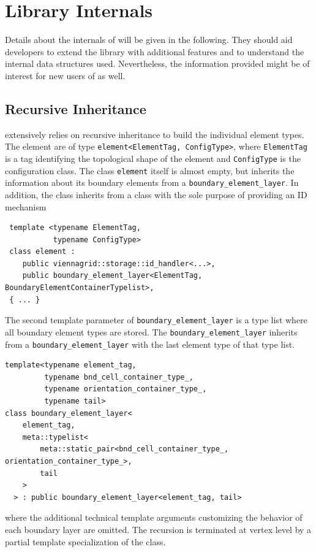 \chapter{Library Internals} \label{chap:internals}

Details about the internals of {\ViennaGrid} will be given in the following.
They should aid developers to extend the library with additional features
and to understand the internal data structures used.
Nevertheless, the information provided might be of interest for new users of {\ViennaGrid} as well.

\section{Recursive Inheritance}
{\ViennaGrid} extensively relies on recursive inheritance to build the individual element types.
The element are of type \lstinline|element<ElementTag, ConfigType>|, where \lstinline|ElementTag| is a tag identifying the topological shape of the element and \lstinline|ConfigType| is the configuration class.
The class \lstinline|element| itself is almost empty, but
inherits the information about its boundary elements from a \lstinline|boundary_element_layer|.
In addition, the class inherits from a class with the sole purpose of providing an ID mechanism
\begin{lstlisting}
 template <typename ElementTag,
           typename ConfigType>
 class element :
    public viennagrid::storage::id_handler<...>,
    public boundary_element_layer<ElementTag, BoundaryElementContainerTypelist>,
 { ... }
\end{lstlisting}
The second template parameter of \lstinline|boundary_element_layer| is a type list where all boundary element types are stored.
The \lstinline|boundary_element_layer| inherits from a \lstinline|boundary_element_layer| with the last element type of that type list.
\begin{lstlisting}
template<typename element_tag,
         typename bnd_cell_container_type_,
         typename orientation_container_type_,
         typename tail>
class boundary_element_layer<
    element_tag,
    meta::typelist<
        meta::static_pair<bnd_cell_container_type_, orientation_container_type_>,
        tail
    >
  > : public boundary_element_layer<element_tag, tail>
\end{lstlisting}
where the additional technical template arguments customizing the behavior of each boundary layer are omitted.
The recursion is terminated at vertex level by a partial template specialization of the class.

